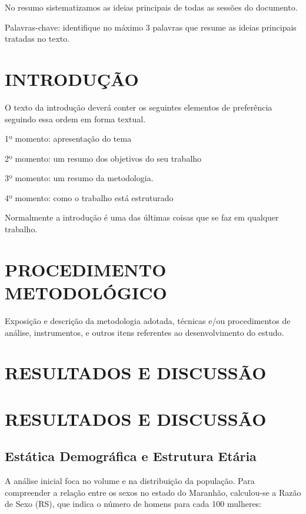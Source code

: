 \documentclass[
  brazilian,
  12pt,
]{article}
\begin{document}
No resumo sistematizamos as ideias principais de todas as sessões do
documento.

Palavras-chave: identifique no máximo 3 palavras que resume as ideias
principais tratadas no texto.

\section{INTRODUÇÃO}\label{introduuxe7uxe3o}

O texto da introdução deverá conter os seguintes elementos de
preferência seguindo essa ordem em forma textual.

1º momento: apresentação do tema

2º momento: um resumo dos objetivos do seu trabalho

3º momento: um resumo da metodologia.

4º momento: como o trabalho está estruturado

Normalmente a introdução é uma das últimas coisas que se faz em qualquer
trabalho.

\section{PROCEDIMENTO METODOLÓGICO}\label{procedimento-metodoluxf3gico}

Exposição e descrição da metodologia adotada, técnicas e/ou
procedimentos de análise, instrumentos, e outros itens referentes ao
desenvolvimento do estudo.

\section{RESULTADOS E DISCUSSÃO}\label{resultados-e-discussuxe3o}

\section{RESULTADOS E DISCUSSÃO}\label{resultados-e-discussuxe3o-1}

\subsection{Estática Demográfica e Estrutura
Etária}\label{estuxe1tica-demogruxe1fica-e-estrutura-etuxe1ria}

A análise inicial foca no volume e na distribuição da população. Para
compreender a relação entre os sexos no estado do Maranhão, calculou-se
a Razão de Sexo (RS), que indica o número de homens para cada 100
mulheres:
\end{document}
